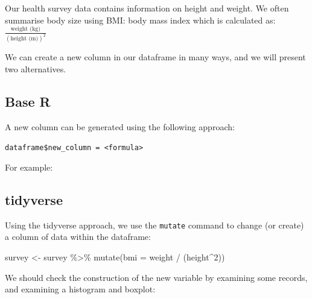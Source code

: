\documentclass[
]{memoir}
\newenvironment{Shaded}{\begin{snugshade}}{\end{snugshade}}
\newcommand{\AttributeTok}[1]{\textcolor[rgb]{0.77,0.63,0.00}{#1}}
\newcommand{\DecValTok}[1]{\textcolor[rgb]{0.00,0.00,0.81}{#1}}
\newcommand{\FunctionTok}[1]{\textcolor[rgb]{0.00,0.00,0.00}{#1}}
\newcommand{\NormalTok}[1]{#1}
\newcommand{\OtherTok}[1]{\textcolor[rgb]{0.56,0.35,0.01}{#1}}
\newcommand{\SpecialCharTok}[1]{\textcolor[rgb]{0.00,0.00,0.00}{#1}}
\begin{document}
Our health survey data contains information on height and weight. We often summarise body size using BMI: body mass index which is calculated as: \(\frac{\text{weight (kg)}}{(\text{height (m)})^2}\)

We can create a new column in our dataframe in many ways, and we will present two alternatives.

\hypertarget{base-r}{%
\subsection{Base R}\label{base-r}}

A new column can be generated using the following approach:

\texttt{dataframe\$new\_column\ =\ \textless{}formula\textgreater{}}

For example:

\begin{Shaded}
\end{Shaded}

\hypertarget{tidyverse}{%
\subsection{tidyverse}\label{tidyverse}}

Using the tidyverse approach, we use the \texttt{mutate} command to change (or create) a column of data within the dataframe:

\begin{Shaded}
\begin{Highlighting}[]
\NormalTok{survey }\OtherTok{\textless{}{-}}\NormalTok{ survey }\SpecialCharTok{\%\textgreater{}\%} 
  \FunctionTok{mutate}\NormalTok{(}\AttributeTok{bmi =}\NormalTok{ weight }\SpecialCharTok{/}\NormalTok{ (height}\SpecialCharTok{\^{}}\DecValTok{2}\NormalTok{))}
\end{Highlighting}
\end{Shaded}

We should check the construction of the new variable by examining some records, and examining a histogram and boxplot:
\end{document}
